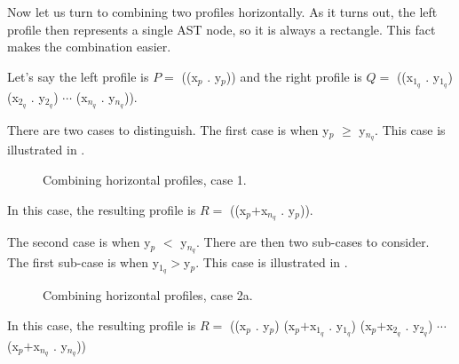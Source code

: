 Now let us turn to combining two profiles horizontally.  As it turns
out, the left profile then represents a single AST node, so it is
always a rectangle.  This fact makes the combination easier.

Let's say the left profile is $P = $ ((x$_p$ . y$_p$)) and the right
profile is $Q = $ ((x$_{1_q}$ . y$_{1_q}$) (x$_{2_q}$ . y$_{2_q}$)
$\cdots$ (x$_{n_q}$ . y$_{n_q}$)).

There are two cases to distinguish.  The first case is when y$_p$ $\ge$
y$_{n_q}$.  This case is illustrated in
.

\begin{figure}
\begin{center}
\end{center}
\caption{\label{fig-profile-horizontal-case-1}
Combining horizontal profiles, case 1.}
\end{figure}

In this case, the resulting profile is $R = $ ((x$_p$$+$x$_{n_q}$ . y$_p$)).

The second case is when y$_p$ $<$ y$_{n_q}$.  There are then two
sub-cases to consider.  The first sub-case is when y$_{1_q}$$>$y$_p$.
This case is illustrated in .

\begin{figure}
\begin{center}
\end{center}
\caption{\label{fig-profile-horizontal-case-2a}
Combining horizontal profiles, case 2a.}
\end{figure}

In this case, the resulting profile is $R = $ ((x$_p$ . y$_p$)
(x$_p$$+$x$_{1_q}$ . y$_{1_q}$) (x$_p$$+$x$_{2_q}$ . y$_{2_q}$)
$\cdots$ (x$_p$$+$x$_{n_q}$ . y$_{n_q}$))
